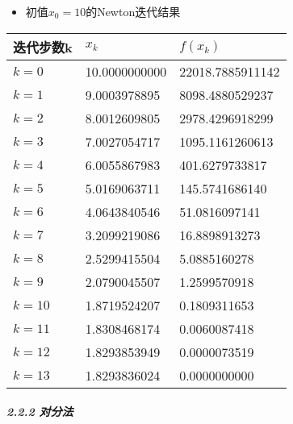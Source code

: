 \documentclass[
]{article}
\begin{document}
\begin{itemize}
\item
  初值\(x_0=10\)的Newton迭代结果
\end{itemize}

\begin{longtable}[]{@{}lll@{}}
\toprule
迭代步数k & \(x_k\) & \(f(x_k)\) \\
\midrule
\endhead
\(k=0\) & 10.0000000000 & 22018.7885911142 \\
\(k=1\) & 9.0003978895 & 8098.4880529237 \\
\(k=2\) & 8.0012609805 & 2978.4296918299 \\
\(k=3\) & 7.0027054717 & 1095.1161260613 \\
\(k=4\) & 6.0055867983 & 401.6279733817 \\
\(k=5\) & 5.0169063711 & 145.5741686140 \\
\(k=6\) & 4.0643840546 & 51.0816097141 \\
\(k=7\) & 3.2099219086 & 16.8898913273 \\
\(k=8\) & 2.5299415504 & 5.0885160278 \\
\(k=9\) & 2.0790045507 & 1.2599570918 \\
\(k=10\) & 1.8719524207 & 0.1809311653 \\
\(k=11\) & 1.8308468174 & 0.0060087418 \\
\(k=12\) & 1.8293853949 & 0.0000073519 \\
\(k=13\) & 1.8293836024 & 0.0000000000 \\
\bottomrule
\end{longtable}

\hypertarget{222-ux5bf9ux5206ux6cd5}{%
\subparagraph{2.2.2 对分法}\label{222-ux5bf9ux5206ux6cd5}}
\end{document}
